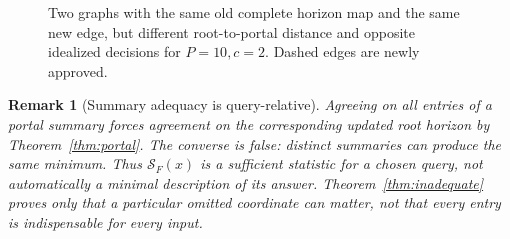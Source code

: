 \documentclass[11pt,letterpaper]{article}
\newtheorem{remark}[theorem]{Remark}
\begin{document}
\begin{figure}[ht]
\centering
{}
\caption{Two graphs with the same old complete horizon map and the same new edge, but different root-to-portal distance and opposite idealized decisions for $P=10,c=2$. Dashed edges are newly approved.}
\end{figure}

\begin{remark}[Summary adequacy is query-relative]
Agreeing on all entries of a portal summary forces agreement on the corresponding updated root horizon by Theorem~\ref{thm:portal}. The converse is false: distinct summaries can produce the same minimum. Thus $\mathcal S_F(x)$ is a \emph{sufficient statistic} for a chosen query, not automatically a minimal description of its answer. Theorem~\ref{thm:inadequate} proves only that a particular omitted coordinate can matter, not that every entry is indispensable for every input.
\end{remark}
\end{document}
